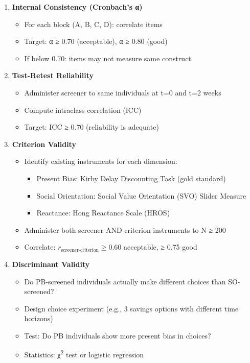 \begin{enumerate}
\item \textbf{Internal Consistency (Cronbach's α)}
  \begin{itemize}[nosep]
  \item For each block (A, B, C, D): correlate items
  \item Target: α ≥ 0.70 (acceptable), α ≥ 0.80 (good)
  \item If below 0.70: items may not measure same construct
  \end{itemize}

\item \textbf{Test-Retest Reliability}
  \begin{itemize}[nosep]
  \item Administer screener to same individuals at t=0 and t=2 weeks
  \item Compute intraclass correlation (ICC)
  \item Target: ICC ≥ 0.70 (reliability is adequate)
  \end{itemize}

\item \textbf{Criterion Validity}
  \begin{itemize}[nosep]
  \item Identify existing instruments for each dimension:
    \begin{itemize}[nosep]
    \item Present Bias: Kirby Delay Discounting Task (gold standard)
    \item Social Orientation: Social Value Orientation (SVO) Slider Measure
    \item Reactance: Hong Reactance Scale (HROS)
    \end{itemize}
  \item Administer both screener AND criterion instruments to N ≥ 200
  \item Correlate: $r_{\text{screener-criterion}} ≥ 0.60$ acceptable, ≥ 0.75 good
  \end{itemize}

\item \textbf{Discriminant Validity}
  \begin{itemize}[nosep]
  \item Do PB-screened individuals actually make different choices than SO-screened?
  \item Design choice experiment (e.g., 3 savings options with different time horizons)
  \item Test: Do PB individuals show more present bias in choices?
  \item Statistics: χ\textsuperscript{2} test or logistic regression
  \end{itemize}


\end{enumerate}
